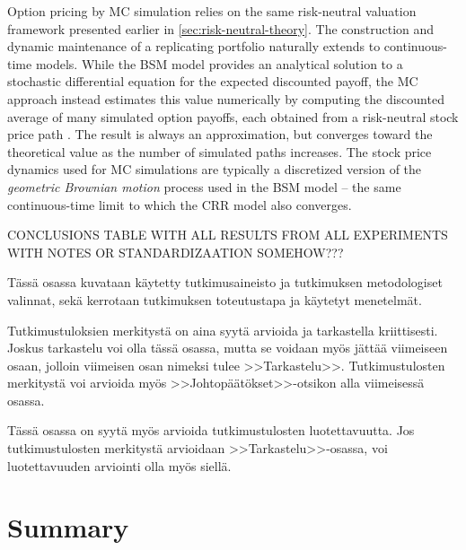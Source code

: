\documentclass[english,12pt,a4paper,pdftex,sci,utf8]{aaltothesis}
\begin{document}
Option pricing by MC simulation relies on the same risk-neutral valuation framework presented earlier in \cref{sec:risk-neutral-theory}. The construction and dynamic maintenance of a replicating portfolio naturally extends to continuous-time models. While the BSM model provides an analytical solution to a stochastic differential equation for the expected discounted payoff, the MC approach instead estimates this value numerically by computing the discounted average of many simulated option payoffs, each obtained from a risk-neutral stock price path \cite{boyle1977options}. The result is always an approximation, but converges toward the theoretical value as the number of simulated paths increases. The stock price dynamics used for MC simulations are typically a discretized version of the \emph{geometric Brownian motion} process used in the BSM model -- the same continuous-time limit to which the CRR model also converges.





CONCLUSIONS TABLE WITH ALL RESULTS FROM ALL EXPERIMENTS WITH NOTES OR STANDARDIZAATION  SOMEHOW???

T\"ass\"a osassa kuvataan k\"aytetty tutkimusaineisto ja
tutkimuksen metodologiset valinnat, sek\"a
kerrotaan tutkimuksen toteutustapa ja k\"aytetyt menetelm\"at. 

\clearpage


Tutkimustuloksien merkityst\"a on aina syyt\"a arvioida ja tarkastella
kriittisesti.  Joskus tarkastelu voi olla t\"ass\"a osassa, mutta se
voidaan my\"os j\"att\"a\"a viimeiseen osaan, jolloin viimeisen osan nimeksi
tulee >>Tarkastelu>>. Tutkimustulosten merkityst\"a voi arvioida my\"os
>>Johtop\"a\"at\"okset>>-otsikon alla viimeisess\"a osassa. 

T\"ass\"a osassa on syyt\"a my\"os arvioida tutkimustulosten luotettavuutta.
Jos tutkimustulosten merkityst\"a arvioidaan >>Tarkastelu>>-osassa,
voi luotettavuuden arviointi olla my\"os siell\"a. 

\clearpage

\section{Summary}  \label{sec:summary}
\end{document}
